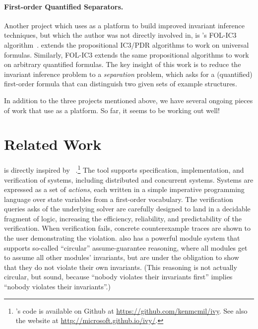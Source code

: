 \paragraph{First-order Quantified Separators.}
Another project which uses \mypyvy as a platform
  to build improved invariant inference techniques,
  but which the author was not directly involved in,
  is \citeauthor{folic3}'s FOL-IC3 algorithm~\cite{folic3}.
\updr extends the propositional IC3/PDR algorithms to work on universal formulas.
Similarly, FOL-IC3 extends the same propositional algorithms to work on arbitrary quantified formulas.
The key insight of this work is to reduce the invariant inference problem to a \emph{separation} problem,
  which asks for a (quantified) first-order formula that can distinguish two given sets of example structures.

In addition to the three projects mentioned above,
  we have several ongoing pieces of work that use \mypyvy as a platform.
So far, it seems to be working out well!

\section{Related Work}


\mypyvy is directly inspired by \ivy~\cite{Padon-al:PLDI16}.\footnote{
  \ivy's code is available on Github at \url{https://github.com/kenmcmil/ivy}.
  See also the \ivy website at \url{http://microsoft.github.io/ivy/}.
}
%
The \ivy tool supports specification, implementation, and verification of systems,
including distributed and concurrent systems.
%
Systems are expressed as a set of \emph{actions},
each written in a simple imperative programming language
over state variables from a first-order vocabulary.
%
The verification queries \ivy asks of the underlying solver
are carefully designed to land in a decidable fragment of logic,
increasing the efficiency, reliability, and predictability
of the verification.
%
When verification fails, concrete counterexample traces
are shown to the user demonstrating the violation.
%
\ivy{} also has a powerful module system
that supports so-called ``circular'' assume-guarantee reasoning,
where all modules get to assume all other modules' invariants,
but are under the obligation to show that they do not violate
their own invariants.
%
(This reasoning is not actually circular, but sound,
because ``nobody violates their invariants first''
implies ``nobody violates their invariants''.)

